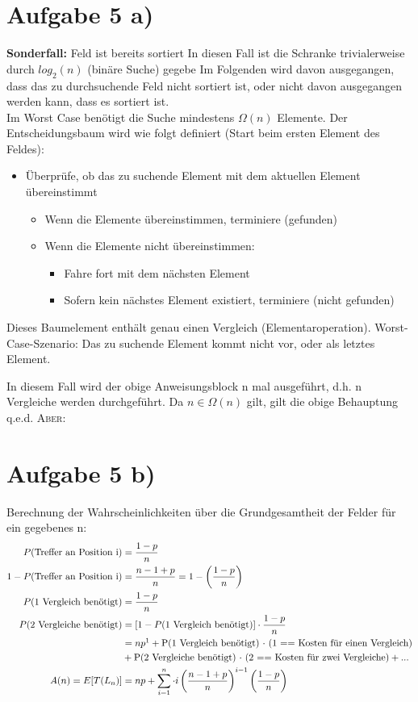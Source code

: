 \documentclass[a4paper,10pt,freqn]{article}
\begin{document}
\section{Aufgabe 5 a)}
\textbf{Sonderfall:} Feld ist bereits sortiert \textrightarrow In diesen Fall ist die Schranke trivialerweise durch $log_2(n)$ (binäre Suche) gegebe
\newline
Im Folgenden wird davon ausgegangen, dass das zu durchsuchende Feld nicht sortiert ist, oder nicht davon ausgegangen werden kann, dass es sortiert ist.\\
Im Worst Case benötigt die Suche mindestens $\Omega(n)$ Elemente.
Der Entscheidungsbaum wird wie folgt definiert (Start beim ersten Element des Feldes):
\begin{itemize}
 \item Überprüfe, ob das zu suchende Element mit dem aktuellen Element übereinstimmt
 \begin{itemize}
  \item Wenn die Elemente übereinstimmen, terminiere (gefunden)
  \item Wenn die Elemente nicht übereinstimmen:
  \begin{itemize}
   \item Fahre fort mit dem nächsten Element
   \item Sofern kein nächstes Element existiert, terminiere (nicht gefunden)
  \end{itemize}
 \end{itemize}
\end{itemize}
Dieses Baumelement enthält genau einen Vergleich (Elementaroperation).
Worst-Case-Szenario: Das zu suchende Element kommt nicht vor, oder als letztes Element.

In diesem Fall wird der obige Anweisungsblock n mal ausgeführt, d.h. n Vergleiche werden durchgeführt.
Da $n \in \Omega(n)$ gilt, gilt die obige Behauptung q.e.d.
{\LARGE \textsc{Aber:}}
\section{Aufgabe 5 b)}
Berechnung der Wahrscheinlichkeiten über die Grundgesamtheit der Felder für ein gegebenes n:
\begin{align*}
 P(\text{Treffer an Position i}) &= \frac{1-p}{n}\\
 1-P(\text{Treffer an Position i}) &= \frac{n-1+p}{n} = 1-\left(\frac{1-p}{n}\right)\\
 P(\text{1 Vergleich benötigt}) &=  \frac{1-p}{n}\\
 P(\text{2 Vergleiche benötigt}) &=  [1-P(\text{1 Vergleich benötigt})]\cdot\frac{1-p}{n}\\
 &= np\footnotemark + \text{P(1 Vergleich benötigt) $\cdot$ (1 == Kosten für einen Vergleich)}\\&+ \text{P(2 Vergleiche benötigt) $\cdot$ (2 == Kosten für zwei Vergleiche)} + ...\\
 A(n) = E[T(L_n)] &= np+\sum_{i=1}^{n}\cdot i\left(\frac{n-1+p}{n}\right)^{i-1}\left(\frac{1-p}{n}\right)
\end{align*}
\end{document}
